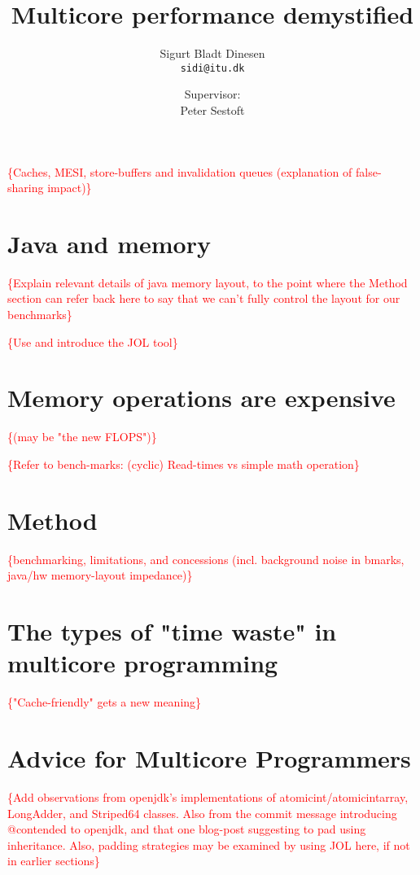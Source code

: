 \documentclass[a4paper, titlepage]{article}
\renewcommand{\%}{\scalebox{.9}{\oldpct}}
\newcommand\mynote[1]{\noindent\textcolor{red}{\{#1\}}}
\begin{document}
\title{Multicore performance demystified}
\author{
	Sigurt Bladt Dinesen
	\\\texttt{sidi@itu.dk}
	\and
	Supervisor:
	\\Peter Sestoft
}

\maketitle
\tableofcontents
\clearpage





\mynote{Caches, MESI, store-buffers and invalidation queues (explanation of false-sharing impact)}

\section{Java and memory}
\mynote{Explain relevant details of java memory layout, to the point where the
Method section can refer back here to say that we can't fully control the layout
for our benchmarks}

\mynote{Use and introduce the JOL tool}

\section{Memory operations are expensive}
\mynote{(may be "the new FLOPS")}

\mynote{Refer to bench-marks: (cyclic) Read-times vs simple math operation}

\section{Method}
\mynote{benchmarking, limitations, and concessions (incl. background
noise in bmarks, java/hw memory-layout impedance)}

\section{The types of "time waste" in multicore programming}
\mynote{"Cache-friendly" gets a new meaning}



\section{Advice for Multicore Programmers}
\mynote{Add observations from openjdk's implementations of
atomicint/atomicintarray, LongAdder, and Striped64 classes. Also from the commit
message introducing @contended to openjdk, and that one blog-post suggesting to
pad using inheritance. Also, padding strategies may be examined by using JOL
here, if not in earlier sections}

\clearpage
\nocite{*}


\end{document}
